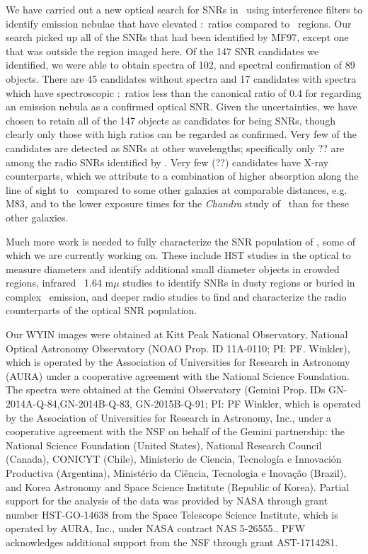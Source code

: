 We have carried out a new optical search for SNRs in \gal\ using interference filters to identify emission nebulae that have elevated \sii:\ha\ ratios compared to \hii\ regions.  Our search picked up all of the SNRs that had been identified by MF97, except one that was outside the region imaged here. Of the 147 SNR candidates we identified, we were able to obtain spectra of 102, and spectral confirmation of 89 objects.  There are 45 candidates  without spectra and 17 candidates with spectra which have spectroscopic \sii:\ha\ ratios less than the canonical ratio of 0.4 for regarding an emission nebula as a confirmed optical SNR.  Given the uncertainties, we have chosen to retain all of the 147 objects as candidates for being SNRs, though clearly only those with high ratios can be regarded as confirmed.  Very few of the candidates are detected as SNRs at other wavelengths; specifically only ?? are among the radio SNRs identified by \cite{lacey01}.  Very few (??) candidates have X-ray counterparts, which we attribute to a combination of higher absorption along the line of sight to \gal\ compared to some other galaxies at comparable distances, e.g. M83, and to the %
lower exposure times for the {\em Chandra} study of \gal\ than for these other galaxies. 

Much more work is needed to fully characterize the SNR population of \gal, some of which we are currently working on.  These include HST studies in the optical to measure diameters and identify additional small diameter objects in crowded regions, infrared \feii\ 1.64 m$\mu$ studies to identify SNRs in dusty regions or buried in complex \ha\ emission, and deeper radio studies to find and characterize the radio counterparts of the optical SNR population. 

\acknowledgments


Our WYIN images were obtained at Kitt Peak National Observatory, National Optical Astronomy Observatory (NOAO Prop. ID 11A-0110; PI: PF. Winkler), which is operated by the Association of Universities for Research in Astronomy (AURA) under a cooperative agreement with the National Science Foundation. The spectra were obtained at the Gemini Observatory (Gemini Prop. IDs GN-2014A-Q-84,GN-2014B-Q-83, GN-2015B-Q-91; PI: PF Winkler, which is operated by the Association of Universities for Research in Astronomy, Inc., under a cooperative agreement with the NSF on behalf of the Gemini partnership: the National Science Foundation (United States), National Research Council (Canada), CONICYT (Chile), Ministerio de Ciencia, Tecnolog\'{i}a e Innovaci\'{o}n Productiva (Argentina), Minist\'{e}rio da Ci\^{e}ncia, Tecnologia e Inova\c{c}\~{a}o (Brazil), and Korea Astronomy and Space Science Institute (Republic of Korea).  Partial support for the analysis of the data was provided by NASA through grant number HST-GO-14638 from the Space Telescope Science Institute, which is operated by AURA, Inc., under NASA contract NAS 5-26555.. PFW acknowledges additional support from the NSF through grant AST-1714281.


